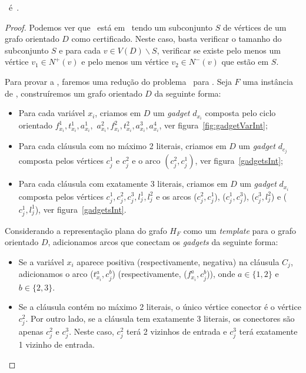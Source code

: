 \begin{theorem}
    \ind~é~\npc.\label{teo-intervalplanar}
\begin{proof}
    Podemos ver que \ind~está em \np~tendo um subconjunto $S$ de vértices de um grafo orientado $D$ como certificado. Neste caso, basta verificar o tamanho do subconjunto $S$ e para cada $v \in V(D) \backslash S$, verificar se existe pelo menos um vértice $v_1 \in N^+(v)$ e pelo menos um vértice $v_2 \in N^-(v)$ que estão em $S$.

    Para provar a \npct, faremos uma redução do problema \sam~para \ind. Seja $F$ uma instância de \sam, construíremos um grafo orientado $D$ da seguinte forma:

    \begin{itemize}
        \item Para cada variável $x_i$, criamos em $D$ um \emph{gadget} $d_{x_i}$ composta pelo ciclo orientado $f^1_{x_i},t^1_{x_i},a^1_{x_i},$ $a^2_{x_i},f^2_{x_i},t^2_{x_i},a^3_{x_i},a^4_{x_i}$, ver figura~\ref{fig:gadgetVarInt};

        \item Para cada cláusula com no máximo 2 literais, criamos em $D$ um \emph{gadget} $d_{c_j}$ composta pelos vértices $c^1_j$ e $c^2_j$ e o arco $(c^2_j, c^1_j)$, ver figura~\ref{gadgetsInt};
        
        \item Para cada cláusula com exatamente 3 literais, criamos em $D$ um \emph{gadget} $d_{x_i}$ composta pelos vértices $c^1_j, c^2_j, c^3_j, l^1_j, l^2_j$ e os arcos ($c^2_j, c^1_j$), ($c^1_j, c^3_j$), ($c^3_j, l^2_j$) e ($c^1_j, l^1_j$), ver figura~\ref{gadgetsInt}.

    \end{itemize}

    Considerando a representação plana do grafo $H_F$ como um \emph{template} para o grafo orientado $D$, adicionamos arcos que conectam os \emph{gadgets} da seguinte forma: 

    \begin{itemize}
        \item Se a variável $x_i$ aparece positiva (respectivamente, negativa) na cláusula $C_j$, adicionamos o arco ($t^a_{x_i}, c^b_j$) (respectivamente, ($f^a_{x_i}, c^b_j$)), onde $a \in \{1,2\}$ e $b \in \{2,3\}$.
        \item Se a cláusula contém no máximo 2 literais, o único vértice conector é o vértice $c^2_j$. Por outro lado, se a cláusula tem exatamente 3 literais, os conectores são apenas $c^2_j$ e $c^3_j$. Neste caso, $c^2_j$ terá 2 vizinhos de entrada e $c^3_j$ terá exatamente 1 vizinho de entrada.


\end{itemize}
\end{proof}
\end{theorem}
